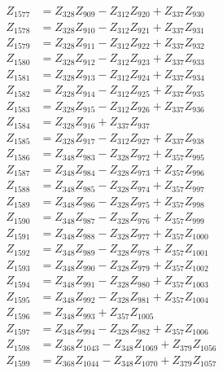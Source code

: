\begin{multicols}{2}
\begin{align}
Z_{1577} &= Z_{328}Z_{909} - Z_{312}Z_{920} + Z_{337}Z_{930} \nonumber \\
Z_{1578} &= Z_{328}Z_{910} - Z_{312}Z_{921} + Z_{337}Z_{931} \nonumber \\
Z_{1579} &= Z_{328}Z_{911} - Z_{312}Z_{922} + Z_{337}Z_{932} \nonumber \\
Z_{1580} &= Z_{328}Z_{912} - Z_{312}Z_{923} + Z_{337}Z_{933} \nonumber \\
Z_{1581} &= Z_{328}Z_{913} - Z_{312}Z_{924} + Z_{337}Z_{934} \nonumber \\
Z_{1582} &= Z_{328}Z_{914} - Z_{312}Z_{925} + Z_{337}Z_{935} \nonumber \\
Z_{1583} &= Z_{328}Z_{915} - Z_{312}Z_{926} + Z_{337}Z_{936} \nonumber \\
Z_{1584} &= Z_{328}Z_{916} + Z_{337}Z_{937} \nonumber \\
Z_{1585} &= Z_{328}Z_{917} - Z_{312}Z_{927} + Z_{337}Z_{938} \nonumber \\
Z_{1586} &= Z_{348}Z_{983} - Z_{328}Z_{972} + Z_{357}Z_{995} \nonumber \\
Z_{1587} &= Z_{348}Z_{984} - Z_{328}Z_{973} + Z_{357}Z_{996} \nonumber \\
Z_{1588} &= Z_{348}Z_{985} - Z_{328}Z_{974} + Z_{357}Z_{997} \nonumber \\
Z_{1589} &= Z_{348}Z_{986} - Z_{328}Z_{975} + Z_{357}Z_{998} \nonumber \\
Z_{1590} &= Z_{348}Z_{987} - Z_{328}Z_{976} + Z_{357}Z_{999} \nonumber \\
Z_{1591} &= Z_{348}Z_{988} - Z_{328}Z_{977} + Z_{357}Z_{1000} \nonumber \\
Z_{1592} &= Z_{348}Z_{989} - Z_{328}Z_{978} + Z_{357}Z_{1001} \nonumber \\
Z_{1593} &= Z_{348}Z_{990} - Z_{328}Z_{979} + Z_{357}Z_{1002} \nonumber \\
Z_{1594} &= Z_{348}Z_{991} - Z_{328}Z_{980} + Z_{357}Z_{1003} \nonumber \\
Z_{1595} &= Z_{348}Z_{992} - Z_{328}Z_{981} + Z_{357}Z_{1004} \nonumber \\
Z_{1596} &= Z_{348}Z_{993} + Z_{357}Z_{1005} \nonumber \\
Z_{1597} &= Z_{348}Z_{994} - Z_{328}Z_{982} + Z_{357}Z_{1006} \nonumber \\
Z_{1598} &= Z_{368}Z_{1043} - Z_{348}Z_{1069} + Z_{379}Z_{1056} \nonumber \\
Z_{1599} &= Z_{368}Z_{1044} - Z_{348}Z_{1070} + Z_{379}Z_{1057} \nonumber \\

\end{align}
\end{multicols}
